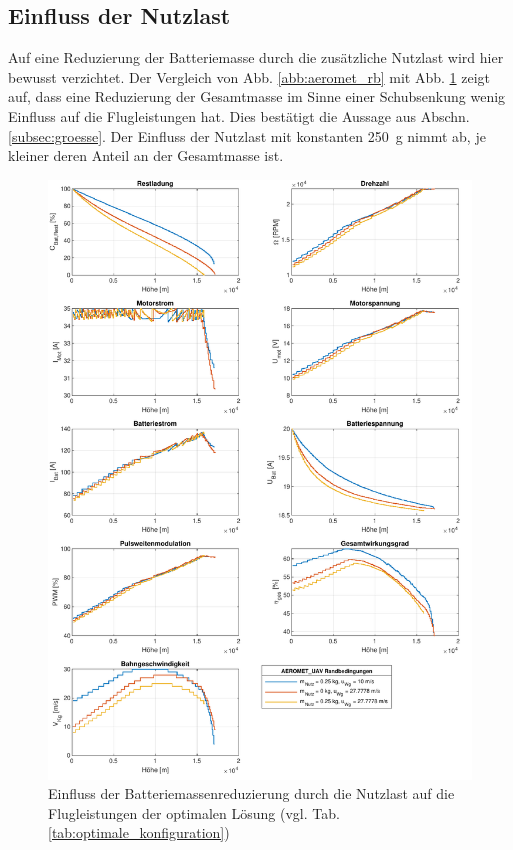 \begin{appendix}
\section{Einfluss der Nutzlast}
\label{sec:einfluss_nutzlast}
Auf eine Reduzierung der Batteriemasse durch die zusätzliche Nutzlast wird hier bewusst verzichtet. Der Vergleich von Abb. \ref{abb:aeromet_rb} mit Abb. \ref{abb:aeromet_rb_batterie_redu} zeigt auf, dass eine Reduzierung der Gesamtmasse im Sinne einer Schubsenkung wenig Einfluss auf die Flugleistungen hat. Dies bestätigt die Aussage aus Abschn. \ref{subsec:groesse}. Der Einfluss der Nutzlast mit konstanten \SI{250}{g} nimmt ab, je kleiner deren Anteil an der Gesamtmasse ist.  

\begin{figure}[H]
\centering
	\includegraphics[scale=0.7]{Diagramme/aeromet_nutzlast_redu.pdf}
	\caption{Einfluss der Batteriemassenreduzierung durch die Nutzlast auf die Flugleistungen der optimalen Lösung (vgl. Tab. \ref{tab:optimale_konfiguration})}
	\label{abb:aeromet_rb_batterie_redu}
\end{figure}



\end{appendix}
